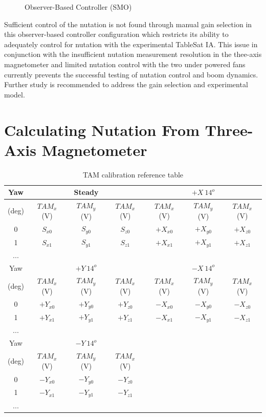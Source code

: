 \begin{figure}[H]
  \centerline{}
  \caption{Observer-Based Controller (SMO)}
  \label{fig:ObserverBasedControllerSMO}
\end{figure}

Sufficient control of the nutation is not found through manual gain selection in this observer-based controller configuration which restricts its ability to adequately control for nutation with the experimental TableSat IA.  This issue in conjunction with the insufficient nutation measurement resolution in the thee-axis magnetometer and limited nutation control with the two under powered fans currently prevents the successful testing of nutation control and boom dynamics.  Further study is recommended to address the gain selection and experimental model.



\section{Calculating Nutation From Three-Axis Magnetometer}

\begin{table}[H]
  \centering
  \begin{tabular}{c|ccc|ccc}
    \hline
    Yaw   & & Steady & & & $+X \ 14^o$ & \\ \hline
    (deg) & $TAM_x$ (V) & $TAM_y$ (V) & $TAM_x$ (V) & $TAM_x$ (V) & $TAM_y$ (V) & $TAM_x$ (V)  \\ \hline
    0 & $S_{x0}$ & $S_{y0}$ & $S_{z0}$ & $+X_{x0}$ & $+X_{y0}$ & $+X_{z0}$ \\ \hline
    1 & $S_{x1}$ & $S_{y1}$ & $S_{z1}$ & $+X_{x1}$ & $+X_{y1}$ & $+X_{z1}$ \\ \hline
    ... & & & & & &  \\ \hline
    Yaw   & & $+Y \ 14^o$ & & & $-X \ 14^o$ & \\ \hline
    (deg) & $TAM_x$ (V) & $TAM_y$ (V) & $TAM_x$ (V) & $TAM_x$ (V) & $TAM_y$ (V) & $TAM_x$ (V)  \\ \hline
    0 & $+Y_{x0}$ & $+Y_{y0}$ & $+Y_{z0}$ & $-X_{x0}$ & $-X_{y0}$ & $-X_{z0}$ \\ \hline
    1 & $+Y_{x1}$ & $+Y_{y1}$ & $+Y_{z1}$ & $-X_{x1}$ & $-X_{y1}$ & $-X_{z1}$ \\ \hline
    ... & & & & & &  \\ \hline
    Yaw   & & $-Y \ 14^o$ & &  \\ \hline
    (deg) & $TAM_x$ (V) & $TAM_y$ (V) & $TAM_x$ (V)  \\ \hline
    0 & $-Y_{x0}$ & $-Y_{y0}$ & $-Y_{z0}$  \\ \hline
    1 & $-Y_{x1}$ & $-Y_{y1}$ & $-Y_{z1}$  \\ \hline
    ... & & & & & &  \\ \hline
  \end{tabular}
  \caption{TAM calibration reference table}
  \label{tbl:TAMCalibration}
\end{table}

